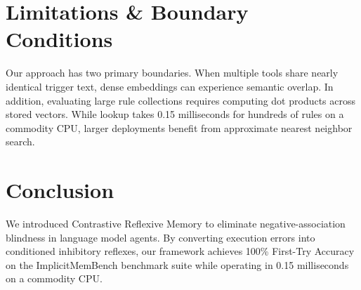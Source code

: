 \documentclass[10pt,conference]{IEEEtran}
\begin{document}
\section{Limitations \& Boundary Conditions}

Our approach has two primary boundaries. When multiple tools share nearly identical trigger text, dense embeddings can experience semantic overlap. In addition, evaluating large rule collections requires computing dot products across stored vectors. While lookup takes 0.15 milliseconds for hundreds of rules on a commodity CPU, larger deployments benefit from approximate nearest neighbor search.

\section{Conclusion}

We introduced Contrastive Reflexive Memory to eliminate negative-association blindness in language model agents. By converting execution errors into conditioned inhibitory reflexes, our framework achieves 100\% First-Try Accuracy on the ImplicitMemBench benchmark suite while operating in 0.15 milliseconds on a commodity CPU.



\end{document}
